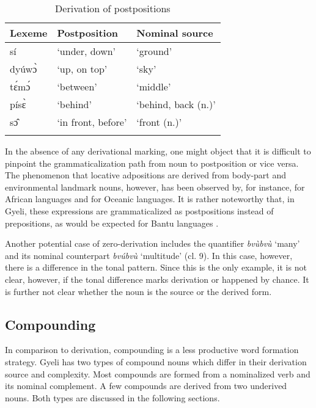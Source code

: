 \begin{table}
\begin{tabular}{lll}
\lsptoprule
Lexeme & Postposition & Nominal source \\  \midrule
sí & `under, down' & `ground' \\
 dyúwɔ̀ &  `up, on top' & `sky' \\
tɛ́mɔ́ &  `between' & `middle' \\
písɛ̀ &   `behind' & `behind, back (n.)' \\
sɔ̂ & `in front, before' & `front (n.)' \\
\lspbottomrule
\end{tabular}
\caption{Derivation of postpositions}
\label{Tab:ZeroDeriv1}
\end{table}

In the absence of any derivational marking, one might object that it is difficult to pinpoint the grammaticalization path from noun to postposition or vice versa. The phenomenon that locative adpositions are derived from body-part and environmental landmark nouns, however, has been observed by, for instance, \citet[215]{kiessling2008} for African languages and \citet{bowden1992} for Oceanic languages. It is rather noteworthy that, in Gyeli, these expressions are grammaticalized as postpositions instead of prepositions, as would be expected for Bantu languages \citep{dryer2013b}.

\hspace*{-1mm}Another potential case of zero-derivation includes the quantifier {\itshape bvùbvù} `many' and its nominal counterpart {\itshape bvúbvù} `multitude' (cl. 9). In this case, however, there is a difference in the tonal pattern. Since this is the only example, it is not clear, however, if the tonal difference marks derivation or happened by chance. It is further not clear whether the noun is the source or the derived form.









\subsection{Compounding}
\label{sec:Compound}

In comparison to derivation, compounding is a less productive word formation strategy.
Gyeli has two types of compound nouns which differ in their derivation source and complexity. Most compounds are formed from a nominalized verb and its nominal complement. A few compounds are derived from two underived nouns. Both types are discussed in the following sections.

